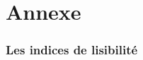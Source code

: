 \documentclass[12pt,a4paper,oneside,titlepage]{article} %
\begin{document}
		
	
	\pagebreak

	\section{Annexe}
	\subsubsection{Les indices de lisibilité}
\end{document}

